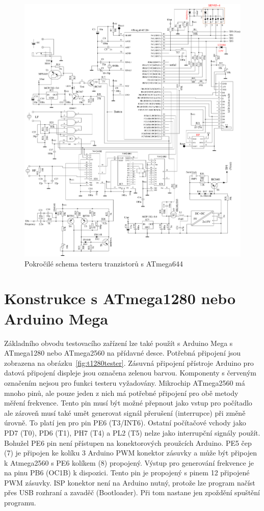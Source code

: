 \label{T644}
\begin{figure}[H]
\centering
\includegraphics[width=1.\textwidth]{../FIG/t644tester.pdf}
\caption{Pokročilé schema testeru tranzistorů s ATmega644}
\label{fig:t644tester}
\end{figure}


\section{Konstrukce s ATmega1280 nebo Arduino Mega}
Základního obvodu testovacího zařízení lze také použít s Arduino Mega s ATmega1280 nebo ATmega2560
na přídavné desce.
Potřebná připojení jsou zobrazena na obrázku~\ref{fig:t1280tester}.
Zásuvná připojení přístroje Arduino pro datová připojení displeje jsou označena zelenou barvou.
Komponenty s červeným označením nejsou pro funkci testeru vyžadovány.
Mikrochip ATmega2560 má mnoho pinů, ale pouze jeden z nich má potřebné připojení pro obě metody měření frekvence. 
Tento pin musí být možné přepnout jako vstup pro počítadlo ale zároveň  musí také umět
generovat signál přerušení (interrupce) při změně úrovně.
To platí jen pro pin PE6 (T3/INT6).
Ostatní počítačové vchody jako PD7 (T0), PD6 (T1), PH7 (T4) a PL2 (T5) nelze jako interrupční signály použít.
Bohužel PE6 pin není přístupen na konektorových proužcích Arduino.
PE5 čep (7) je připojen ke kolíku 3 Arduino PWM konektor zásuvky a může být připojen
k Atmega2560 s PE6 kolíkem (8) propojený.
Výstup pro generování frekvence je na pinu PB6 (OC1B) k dispozici.
Tento pin je propojený s pinem 12 připojené PWM zásuvky.
ISP konektor není na Arduino nutný, protože lze program načíst přes USB rozhraní a zavaděč (Bootloader).
Při tom nastane jen zpoždění spuštění programu.

